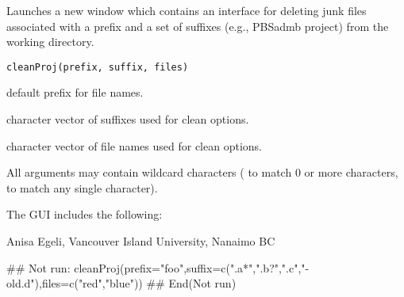 \documentclass[letterpaper]{book}
\begin{document}
\begin{Description}\relax
Launches a new window which contains an interface for deleting 
junk files associated with a prefix and a set of suffixes 
(e.g., PBSadmb project) from the working directory.
\end{Description}
\begin{Usage}
\begin{verbatim}
cleanProj(prefix, suffix, files)
\end{verbatim}
\end{Usage}
\begin{Arguments}
\begin{ldescription}
\item[\code{prefix}] default prefix for file names.
\item[\code{suffix}] character vector of suffixes used for clean options.
\item[\code{files}] character vector of file names used for clean options.
\end{ldescription}
\end{Arguments}
\begin{Details}\relax
All arguments may contain wildcard characters ( to match 0 or
more characters,  to match any single character).

The GUI includes the following:
\end{Details}
\begin{Author}\relax
Anisa Egeli, Vancouver Island University, Nanaimo BC
\end{Author}
\begin{Examples}
\begin{ExampleCode}
## Not run: 
cleanProj(prefix="foo",suffix=c(".a*",".b?",".c","-old.d"),files=c("red","blue"))
## End(Not run)
\end{ExampleCode}
\end{Examples}
\end{document}
